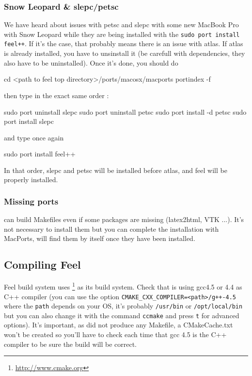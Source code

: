 \subsubsection{Snow Leopard \& slepc/petsc}
We have heard about issues with petsc and slepc with some new MacBook Pro with Snow Leopard while they are being installed with the \lstinline|sudo port install feel++|. If it's the case, that probably means there is an issue with atlas. If atlas is already installed, you have to unsinstall it (be carefull with dependencies, they also have to be uninstalled). Once it's done, you should do
\begin{unixcom}
		cd <path to feel top directory>/ports/macosx/macports
		portindex -f
\end{unixcom}

then type in the exact same order :
\begin{unixcom}
		sudo port uninstall slepc
		sudo port uninstall petsc
		sudo port install -d petsc
		sudo port install slepc
\end{unixcom}
and type once again
\begin{unixcom}
		sudo port install feel++
\end{unixcom}

\noindent In that order, slepc and petsc will be installed before atlas, and feel will be properly installed.

\subsubsection{Missing ports}
\cmake can build Makefiles even if some packages are missing (latex2html, VTK ...). It's not necessary to install them but you can complete the installation with MacPorts, \cmake will find them by itself once they have been installed.

\subsection{Compiling Feel}
\label{compilingfeel}
Feel build system uses \cmake{}\footnote{\url{http://www.cmake.org}}
as its build system. Check that \cmake is using gcc4.5 or 4.4 as C++ compiler
(you can use the option \lstinline|CMAKE_CXX_COMPILER=<path>/g++-4.5| where the
\lstinline|path| depends on your OS, it's probably \lstinline|/usr/bin| or
\lstinline|/opt/local/bin| but you can also change it with the command \lstinline|ccmake|
and press \lstinline|t| for advanced options).  It's important, as \cmake did
not produce any Makefile, a CMakeCache.txt won't be created so you'll have to
check each time that gcc 4.5 is the C++ compiler to be sure the build will be
correct.

